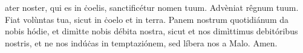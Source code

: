 ater noster, qui es in ċoelis, sanctificétur nomen tuum. Advèniat rêgnum tuum. Fiat volùntas tua, sicut in ċoelo et in terra. Panem nostrum quotidiánum da nobis hódie, et dimìtte nobis débita nostra, sicut et nos dimìttimus debitóribus nostris, et ne nos indúċas in temptaziónem, sed líbera nos a Malo.
Amen.
